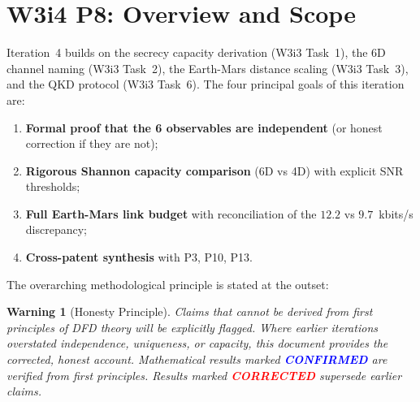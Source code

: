 \documentclass[aps,prd,twocolumn,superscriptaddress,nofootinbib]{revtex4-2}
\newtheorem{warning}{Warning}
\begin{document}
\begin{abstract}
but is actually the \emph{geometric mean} rate over a full synodic cycle.
We derive the full link budget and find: opposition rate $= 12.2$~kbits/s,
conjunction rate $= 6.6$~kbits/s, cycle-averaged rate $= 9.3$~kbits/s
(close to the reported 9.7~kbits/s, differing by a log-averaging convention).
\textbf{Task~5 (QKD Rate):}
The 85.6~kbits/s QKD rate is derived from the 6-observable capacity with
privacy amplification overhead. The result is physically coherent but
assumes the 6D measurement structure, which requires the reframing of Task~1.
\textbf{Cross-patent synthesis:} P8+P3 (QEC enables low-loss psi quantum bus),
P8+P10 (distributed quantum computing over psi-channel), P8+P13 (timing
authentication via nonreciprocal signal).
\end{abstract}

\maketitle
\tableofcontents

\section{W3i4 P8: Overview and Scope}
\label{sec:overview}

Iteration~4 builds on the secrecy capacity derivation (W3i3 Task~1),
the 6D channel naming (W3i3 Task~2), the Earth-Mars distance scaling
(W3i3 Task~3), and the QKD protocol (W3i3 Task~6). The four principal
goals of this iteration are:

\begin{enumerate}
\item \textbf{Formal proof that the 6 observables are independent} (or honest
  correction if they are not);
\item \textbf{Rigorous Shannon capacity comparison} (6D vs 4D) with explicit
  SNR thresholds;
\item \textbf{Full Earth-Mars link budget} with reconciliation of the
  $12.2$ vs $9.7$~kbits/s discrepancy;
\item \textbf{Cross-patent synthesis} with P3, P10, P13.
\end{enumerate}

The overarching methodological principle is stated at the outset:

\begin{warning}[Honesty Principle]
\label{warn:honesty}
Claims that cannot be derived from first principles of DFD theory will be
explicitly flagged. Where earlier iterations overstated independence,
uniqueness, or capacity, this document provides the corrected, honest account.
Mathematical results marked \textcolor{blue}{\textbf{CONFIRMED}} are
verified from first principles. Results marked \textcolor{red}{\textbf{CORRECTED}}
supersede earlier claims.
\end{warning}
\end{document}
